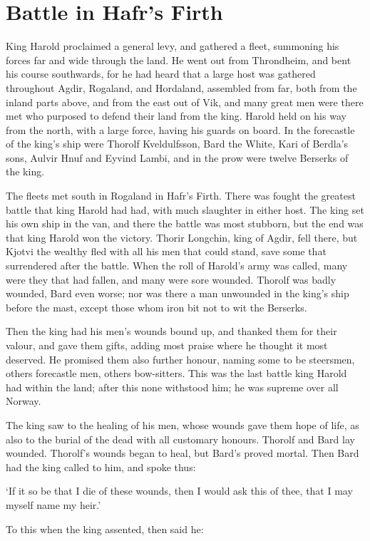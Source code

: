 \chapter{Battle in Hafr's Firth}
King Harold proclaimed a general levy, and gathered a fleet, summoning his forces far and wide through the land. He went out from Throndheim, and bent his course southwards, for he had heard that a large host was gathered throughout Agdir, Rogaland, and Hordaland, assembled from far, both from the inland parts above, and from the east out of Vik, and many great men were there met who purposed to defend their land from the king. Harold held on his way from the north, with a large force, having his guards on board. In the forecastle of the king's ship were Thorolf Kveldulfsson, Bard the White, Kari of Berdla's sons, Aulvir Hnuf and Eyvind Lambi, and in the prow were twelve Berserks of the king.

The fleets met south in Rogaland in Hafr's Firth. There was fought the greatest battle that king Harold had had, with much slaughter in either host. The king set his own ship in the van, and there the battle was most stubborn, but the end was that king Harold won the victory. Thorir Longchin, king of Agdir, fell there, but Kjotvi the wealthy fled with all his men that could stand, save some that surrendered after the battle. When the roll of Harold's army was called, many were they that had fallen, and many were sore wounded. Thorolf was badly wounded, Bard even worse; nor was there a man unwounded in the king's ship before the mast, except those whom iron bit not to wit the Berserks.

Then the king had his men's wounds bound up, and thanked them for their valour, and gave them gifts, adding most praise where he thought it most deserved. He promised them also further honour, naming some to be steersmen, others forecastle men, others bow-sitters. This was the last battle king Harold had within the land; after this none withstood him; he was supreme over all Norway.

The king saw to the healing of his men, whose wounds gave them hope of life, as also to the burial of the dead with all customary honours. Thorolf and Bard lay wounded. Thorolf's wounds began to heal, but Bard's proved mortal. Then Bard had the king called to him, and spoke thus:

`If it so be that I die of these wounds, then I would ask this of thee, that I may myself name my heir.'

To this when the king assented, then said he:

